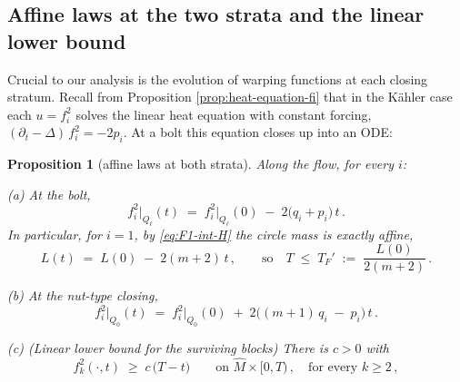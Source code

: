 \documentclass[11pt]{amsart}
\theoremstyle{plain}
\numberwithin{equation}{section}
\newtheorem{proposition}[theorem]{Proposition}
\theoremstyle{definition}
\theoremstyle{remark}
\begin{document}
\subsection{Affine laws at the two strata and the linear lower bound}\label{subsec:affine-laws}

Crucial to our analysis is the evolution of warping functions at each closing stratum. Recall from Proposition \ref{prop:heat-equation-fi} that in the Kähler case each $u = f_i^2$ solves the linear heat equation with constant forcing, $( \partial_t - \Delta )\, f_i^2 = -2 p_i$. At a bolt this equation closes up into an ODE:

\begin{proposition}[affine laws at both strata]\label{prop:affine-laws}
	Along the flow, for every $i$:
	
	{(a) At the bolt,} %
	\[
	f_i^2 \big|_{Q_\ell} (t) \;=\; f_i^2 \big|_{Q_\ell} (0) \;-\; 2 \big( q_i + p_i \big)\, t \,.
	\]
	In particular, for $i = 1$, by \eqref{eq:F1-int-H} the circle mass is exactly affine,
	\begin{equation}\label{eq:circle-mass-affine}
		L (t) \;=\; L (0) \;-\; 2 ( m + 2 )\, t \,, \qquad \text{so} \quad T \;\leq\; T_F' \;:=\; \frac{L (0)}{2 ( m + 2 )} \,.
	\end{equation}
	
	{(b) At the nut-type closing,}
	\begin{equation}\label{eq:nut-affine}
		f_i^2 \big|_{Q_0} (t) \;=\; f_i^2 \big|_{Q_0} (0) \;+\; 2 \big( ( m + 1 )\, q_i \;-\; p_i \big)\, t \,.
	\end{equation}
	
	{(c) (Linear lower bound for the surviving blocks)} There is $c > 0$ with
	\begin{equation}\label{eq:linear-lower-bound}
		f_k^2 (\cdot, t) \;\geq\; c\, \big( T - t \big) \qquad \text{on } \widehat{M} \times [0, T) \,, \quad \text{for every } k \geq 2 \,,
	\end{equation}
	
	
\end{proposition}
\end{document}
